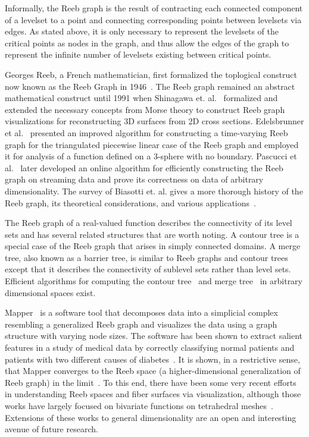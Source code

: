 Informally, the Reeb graph is the result of contracting each connected component of a levelset to a point and connecting corresponding points between levelsets via edges.
%
As stated above, it is only necessary to represent the levelsets of the critical points as nodes in the graph, and thus allow the edges of the graph to represent the infinite number of levelsets existing between critical points.

Georges Reeb, a French mathematician, first formalized the toplogical construct now known as the Reeb Graph in 1946~\cite{Reeb1946}.
%
The Reeb graph remained an abstract mathematical construct until 1991 when Shinagawa et. al.~\cite{ShinagawaKuniiKergosien1991} formalized and extended the necessary concepts from Morse theory to construct Reeb graph visualizations for reconstructing 3D surfaces from 2D cross sections.
%
Edelsbrunner et al.~\cite{EdelsbrunnerHarerMascarenhas2008} presented an improved algorithm for constructing a time-varying Reeb graph for the triangulated piecewise linear case of the Reeb graph and employed it for analysis of a function defined on a 3-sphere with no boundary.
%
Pascucci et al.~\cite{PascucciScorzelliBremer2007} later developed an online algorithm for efficiently constructing the Reeb graph on streaming data and prove its correctness on data of arbitrary dimensionality.
%
The survey of Biasotti et. al. gives a more thorough history of the Reeb graph, its theoretical considerations, and various applications~\cite{BiasottiGiorgiSpagnuolo2008}.


The Reeb graph of a real-valued function describes the connectivity of its level sets and has several related structures that are worth noting.
%
A contour tree is a special case of the Reeb graph that arises in simply connected domains.
%
A merge tree, also known as a barrier tree, is similar to Reeb graphs and contour trees except that it describes the connectivity of sublevel sets rather than level sets.
%
Efficient algorithms for computing the contour tree~\cite{CarrSnoeyinkAxen2003,ChiangLenzLu2005} and merge tree~\cite{OesterlingHeineWeber2015} in arbitrary dimensional spaces exist.

Mapper~\cite{SinghMemoliCarlsson2007} is a software tool that decomposes data into a simplicial complex resembling a generalized Reeb graph and visualizes the data using a graph structure with varying node sizes.
%
The software has been shown to extract salient features in a study of medical data by correctly classifying normal patients and patients with two different causes of diabetes~\cite{SarikondaPettusPhatak2014}.
%
It is shown, in a restrictive sense, that Mapper converges to the Reeb space (a higher-dimensional generalization of Reeb graph) in the limit~\cite{MunchWang2016}.
%
To this end, there have been some very recent efforts in understanding Reeb spaces and fiber surfaces via visualization, although those works have largely focused on bivariate functions on tetrahedral meshes~\cite{CarrGengTierny2015,KlacanskyTiernyCarr2016,TiernyCarr2016}.
%
Extensions of these works to general dimensionality are an open and interesting avenue of future research.

